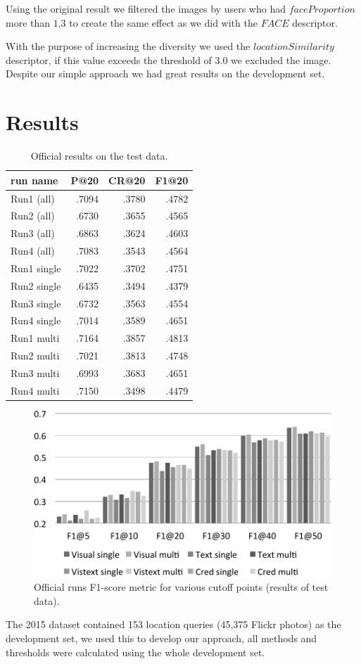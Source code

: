 \documentclass{acm_proc_article-me}
\begin{document}
Using the original result we filtered the images by users who had $faceProportion$ more than $1.3$ to create the same effect as we did with the $FACE$ descriptor.


With the purpose of increasing the diversity we used the $locationSimilarity$ descriptor, if this value exceeds the threshold of $3.0$ we excluded the image. Despite our simple approach we had great results on the development set.

\section{Results}

\begin{table}[t]
	\centering
\begin{tabular}{|l|r|r|r|}
	\hline 
	run name & P@20 & CR@20 & F1@20\tabularnewline
	\hline 
	\hline 
	Run1 (all)& .7094 & .3780 & .4782\tabularnewline
	\hline
	Run2 (all) & .6730 & .3655 & .4565\tabularnewline
	\hline
	Run3 (all) & .6863 & .3624 & .4603\tabularnewline
	\hline
	Run4 (all) & .7083 & .3543 & .4564\tabularnewline
	\hline 
	\hline 
	Run1 single & .7022 & .3702 & .4751\tabularnewline
	\hline 
	Run2 single & .6435 & .3494 & .4379\tabularnewline
	\hline 
	Run3 single & .6732 & .3563 & .4554\tabularnewline
	\hline 
	Run4 single & .7014 & .3589 & .4651\tabularnewline
	\hline
	\hline  
	Run1 multi & .7164 & .3857 & .4813\tabularnewline
	\hline 
	Run2 multi & .7021 & .3813 & .4748\tabularnewline
	\hline 
	Run3 multi & .6993 & .3683 & .4651\tabularnewline
	\hline 
	Run4 multi & .7150 & .3498 & .4479\tabularnewline
	\hline
\end{tabular}
\label{table:results}
\caption{Official results on the test data.}
\end{table}

\begin{figure}[t]
\includegraphics[width=1.0\linewidth]{f1}
\caption{Official runs F1-score metric for various cutoff points (results of test data).}
\label{fig:f1}
\end{figure}
The 2015 dataset contained 153 location queries (45,375 Flickr photos) as the development set, we used this to develop our approach, all methods and thresholds were calculated using the whole development set.
\end{document}
